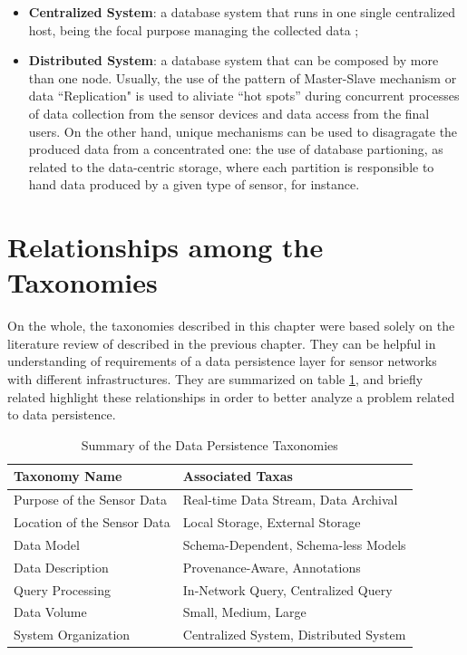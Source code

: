 \begin{itemize}
  \item \textbf{Centralized System}: a database system that runs in one single
  centralized host, being the focal purpose managing the collected data
  \cite{sn-intro01};
  \item \textbf{Distributed System}: a database system that can be composed by
  more than one node. Usually, the use of the pattern of Master-Slave
  mechanism or data ``Replication" is used to aliviate ``hot spots'' during
  concurrent processes of data collection from the sensor devices and data
  access from the final users. On the other hand, unique mechanisms can be
  used to disagragate the produced data from a concentrated one: the use 
  of database partioning, as related to the data-centric storage, where  
  each partition is responsible to hand data produced by a given type of 
  sensor, for instance.
\end{itemize}

\section{Relationships among the Taxonomies}

On the whole, the taxonomies described in this chapter were based solely on the
literature review of described in the previous chapter. They can be helpful in 
understanding of requirements of a data persistence layer for sensor networks
with different infrastructures. They are summarized on table
\ref{tab:taxonomies-list-summary}, and briefly related highlight these
relationships in order to better analyze a problem related to data persistence.

\begin{table}[!b]
    \label{tab:taxonomies-list-summary}
    \begin{center}
        \begin{tabular}{|p{170pt}|p{250pt}|}\hline 
        \textbf{Taxonomy Name} & \textbf{Associated Taxas}\\\hline 
        Purpose of the Sensor Data & Real-time Data Stream, Data Archival \\\hline 
        Location of the Sensor Data & Local Storage, External Storage\\\hline
        Data Model & Schema-Dependent, Schema-less Models\\\hline 
        Data Description & Provenance-Aware, Annotations\\\hline
        Query Processing & In-Network Query, Centralized Query\\\hline 
        Data Volume & Small, Medium, Large\\\hline
        System Organization & Centralized System, Distributed System\\\hline
        \end{tabular}
    \end{center}
    \caption{Summary of the Data Persistence Taxonomies}
\end{table}


